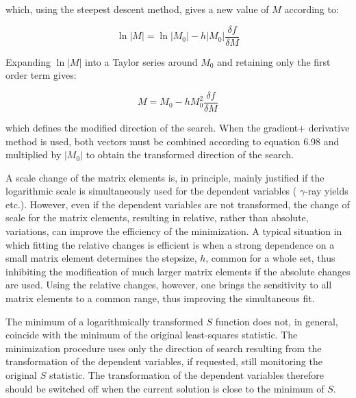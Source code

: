 \documentclass[10pt]{article}
\begin{document}
which, using the steepest descent method, gives a new value of $M$ according to:


\begin{equation*}
\ln |M|=\ln \left|M_{0}\right|-h\left|M_{0}\right| \frac{\delta f}{\delta M} \tag{6.106}
\end{equation*}


Expanding $\ln |M|$ into a Taylor series around $M_{0}$ and retaining only the first order term gives:


\begin{equation*}
M=M_{0}-h M_{0}^{2} \frac{\delta f}{\delta M} \tag{6.107}
\end{equation*}


which defines the modified direction of the search. When the gradient+ derivative method is used, both vectors must be combined according to equation 6.98 and multiplied by $\left|M_{0}\right|$ to obtain the transformed direction of the search.

A scale change of the matrix elements is, in principle, mainly justified if the logarithmic scale is simultaneously used for the dependent variables ( $\gamma$-ray yields etc.). However, even if the dependent variables are not transformed, the change of scale for the matrix elements, resulting in relative, rather than absolute, variations, can improve the efficiency of the minimization. A typical situation in which fitting the relative changes is efficient is when a strong dependence on a small matrix element determines the stepsize, $h$, common for a whole set, thus inhibiting the modification of much larger matrix elements if the absolute changes are used. Using the relative changes, however, one brings the sensitivity to all matrix elements to a common range, thus improving the simultaneous fit.

The minimum of a logarithmically transformed $S$ function does not, in general, coincide with the minimum of the original least-squares statistic. The minimization procedure uses only the direction of search resulting from the transformation of the dependent variables, if requested, still monitoring the original $S$ statistic. The transformation of the dependent variables therefore should be switched off when the current solution is close to the minimum of $S$.
\end{document}
